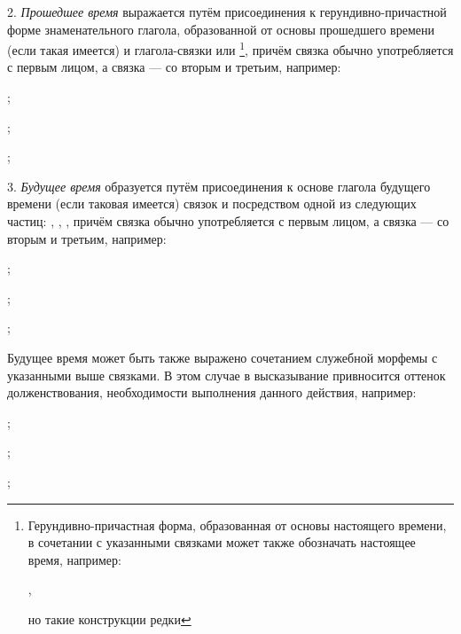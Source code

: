 2. \emph{Прошедшее время} выражается путём присоединения к герун\-див\-но-при\-част\-ной форме знаменательного глагола, образованной от основы прошедшего времени (если такая имеется) и глагола-связки  или \footnote[38]{Герундивно-причастная форма, образованная от основы настоящего времени, в сочетании с указанными связками может также обозначать настоящее время, например:
\begin{prfsample}
	\item {},
\end{prfsample}
но такие конструкции редки},
причём связка  обычно употребляется с первым лицом, а связка  --- со вторым и третьим, например:
\begin{prfsample}
	\item {};
	\item {};
	\item {};
\end{prfsample}

3. \emph{Будущее время} образуется путём присоединения к основе глагола будущего времени (если таковая имеется) связок  и  посредством одной из следующих частиц: , , , причём связка  обычно употребляется с первым лицом, а связка  --- со вторым и третьим, например:
\begin{prfsample}
	\item {};
	\item {};
	\item {};
\end{prfsample}

Будущее время может быть также выражено сочетанием служебной морфемы  с указанными выше связками. В этом случае в высказывание привносится оттенок долженствования, необходимости выполнения данного действия, например:
\begin{prfsample}
	\item{};
	\item{};
	\item{};
\end{prfsample}

